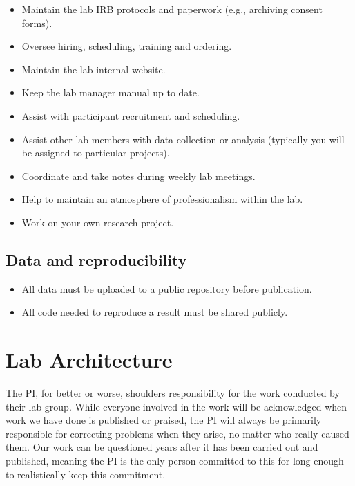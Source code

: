 \documentclass[
]{book}
\providecommand{\tightlist}{%
  \setlength{\itemsep}{0pt}\setlength{\parskip}{0pt}}
\begin{document}
\begin{itemize}
\tightlist
\item
  Maintain the lab IRB protocols and paperwork (e.g., archiving consent forms).
\item
  Oversee hiring, scheduling, training and ordering.
\item
  Maintain the lab internal website.
\item
  Keep the lab manager manual up to date.
\item
  Assist with participant recruitment and scheduling.
\item
  Assist other lab members with data collection or analysis (typically you will be assigned to particular projects).
\item
  Coordinate and take notes during weekly lab meetings.
\item
  Help to maintain an atmosphere of professionalism within the lab.
\item
  Work on your own research project.
\end{itemize}

\hypertarget{data-and-reproducibility}{%
\subsection{Data and reproducibility}\label{data-and-reproducibility}}

\begin{itemize}
\tightlist
\item
  All data must be uploaded to a public repository before publication.
\item
  All code needed to reproduce a result must be shared publicly.
\end{itemize}

\hypertarget{lab-architecture}{%
\section{Lab Architecture}\label{lab-architecture}}

The PI, for better or worse, shoulders responsibility for the work conducted by their lab group. While everyone involved in the work will be acknowledged when work we have done is published or praised, the PI will always be primarily responsible for correcting problems when they arise, no matter who really caused them. Our work can be questioned years after it has been carried out and published, meaning the PI is the only person committed to this for long enough to realistically keep this commitment.
\end{document}
